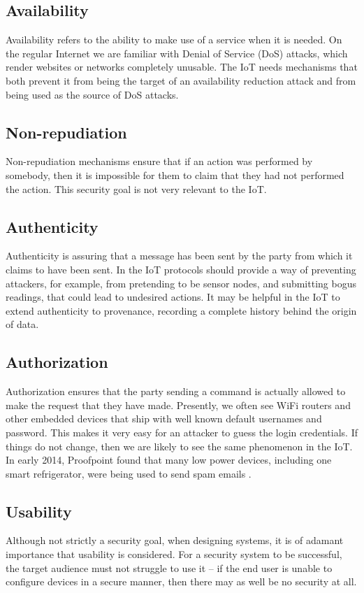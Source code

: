 \documentclass[10pt,journal,compsoc]{IEEEtran}
\begin{document}
\subsection{Availability}
Availability refers to the ability to make use of a service when it is needed.
On the regular Internet we are familiar with Denial of Service (DoS) attacks,
which render websites or networks completely unusable. The IoT needs mechanisms
that both prevent it from being the target of an availability reduction attack
and from being used as the source of DoS attacks.

\subsection{Non-repudiation}
Non-repudiation mechanisms ensure that if an action was performed by somebody,
then it is impossible for them to claim that they had not performed the action.
This security goal is not very relevant to the IoT. 

\subsection{Authenticity}
Authenticity is assuring that a message has been sent by the party from which
it claims to have been sent. In the IoT protocols should provide a way of
preventing attackers, for example, from pretending to be sensor nodes, and
submitting bogus readings, that could lead to undesired actions. It may be
helpful in the IoT to extend authenticity to provenance, recording a complete
history behind the origin of data.  

\subsection{Authorization}
Authorization ensures that the party sending a command is actually allowed
to make the request that they have made. Presently, we often see WiFi routers
and other embedded devices that ship with well known default usernames
and password. This makes it very easy for an attacker to guess the login
credentials. If things do not change, then we are likely to see the same
phenomenon in the IoT. In early 2014, Proofpoint found that many low power
devices, including one smart refrigerator, were being used to send spam emails
\cite{Proofpoint2014}.

\subsection{Usability}
Although not strictly a security goal, when designing systems, it is of
adamant importance that usability is considered. For a security system to be
successful, the target audience must not struggle to use it -- if the end
user is unable to configure devices in a secure manner, then there may as well
be no security at all. 
\end{document}
